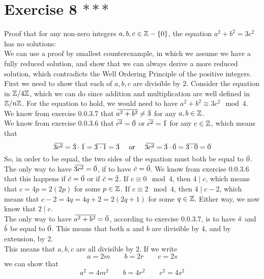 \documentclass[12pt]{article}
\begin{document}
    \section*{Exercise 8 $***$}
    Proof that for any non-zero integers $a, b, c \in \mathbb{Z} - \{ 0 \}$, 
    the equation $a^2 + b^2 = 3c^2$ has no solutions: \\
    We can use a proof by smallest counterexample,
    in which we assume we have a fully reduced solution,
    and show that we can always derive a more reduced solution,
    which contradicts the Well Ordering Principle
    of the positive integers. \\
    First we need to show that each of $a, b, c$
    are divisible by $2$.
    Consider the equation in $\mathbb{Z}/4\mathbb{Z}$,
    which we can do since addition and multiplication are well defined
    in $\mathbb{Z}/n\mathbb{Z}$.
    For the equation to hold,
    we would need to have $a^2 + b^2 \equiv 3c^2 \mod 4$. \\
    We know from exercise 0.0.3.7
    that $\,\overline{\!{a^2 + b^2}} \neq \,\overline{\!{3}}$
    for any $a, b \in \mathbb{Z}$. \\
    We know from exercise 0.0.3.6 that $\,\overline{\!{c^2}} = \,\overline{\!{0}}$
    or $\,\overline{\!{c^2}} = \,\overline{\!{1}}$ for any $c \in \mathbb{Z}$,
    which means that
    \[ \olsi{3c^2} = \olsi{3} \cdot \olsi{1}
    = \olsi{3 \cdot 1} = \olsi{3} 
    \quad \text { or } \quad
    \olsi{3c^2} = \olsi{3} \cdot \olsi{0}
    = \olsi{3 \cdot 0} = \olsi{0} \]
    So, in order to be equal, the two sides of the equation must
    both be equal to $\,\overline{\!{0}}$. \\
    The only way to have $\,\overline{\!{3c^2}} = \,\overline{\!{0}}$,
    if to have $\,\overline{\!{c}} = \,\overline{\!{0}}$.
    We know from exercise 0.0.3.6 that this happens if
    $\,\overline{\!{c}} = \,\overline{\!{0}}$ or if $\,\overline{\!{c}} = \,\overline{\!{2}}$.
    If $c \equiv 0 \mod 4$,
    then $4 \mid c$, which means that $c = 4p = 2(2p)$
    for some $p \in \mathbb{Z}$.
    If $c \equiv 2 \mod 4$,
    then $4 \mid c - 2$, which means that $c - 2 = 4q = 4q + 2 = 2(2q + 1)$
    for some $q \in \mathbb{Z}$.
    Either way, we now know that $2 \mid c$. \\
    The only way to have $\,\overline{\!{a^2 + b^2}} = \,\overline{\!{0}}$,
    according to exercise 0.0.3.7,
    is to have $\,\overline{\!{a}}$ and $\,\overline{\!{b}}$ be equal to $\,\overline{\!{0}}$.
    This means that both $a$ and $b$ are divisible by $4$,
    and by extension, by $2$. \\
    This means that $a, b, c$ are all divisible by $2$.
    If we write
    \[ a = 2m \qquad b = 2r \qquad c = 2s \]
    we can show that
    \[ a^2 = 4m^2 \qquad b = 4r^2 \qquad c^2 = 4s^2 \]
\end{document}
